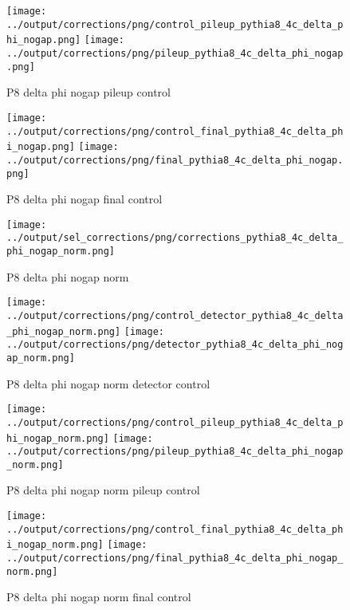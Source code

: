 \documentclass[11pt]{book}
\begin{document}
\begin{figure}[ht]
\centering
\texttt{[image: ../output/corrections/png/control\_pileup\_pythia8\_4c\_delta\_phi\_nogap.png]}
\texttt{[image: ../output/corrections/png/pileup\_pythia8\_4c\_delta\_phi\_nogap.png]}
\caption{P8 delta phi nogap pileup control}
\label{fig:p8_delta_phi_nogap_pileup_control}
\end{figure}


\begin{figure}[ht]
\centering
\texttt{[image: ../output/corrections/png/control\_final\_pythia8\_4c\_delta\_phi\_nogap.png]}
\texttt{[image: ../output/corrections/png/final\_pythia8\_4c\_delta\_phi\_nogap.png]}
\caption{P8 delta phi nogap final control}
\label{fig:p8_delta_phi_nogap_final_control}
\end{figure}


\begin{figure}[ht]
\centering
\texttt{[image: ../output/sel\_corrections/png/corrections\_pythia8\_4c\_delta\_phi\_nogap\_norm.png]}
\caption{P8 delta phi nogap norm}
\label{fig:p8_delta_phi_nogap_norm}
\end{figure}

\begin{figure}[ht]
\centering
\texttt{[image: ../output/corrections/png/control\_detector\_pythia8\_4c\_delta\_phi\_nogap\_norm.png]}
\texttt{[image: ../output/corrections/png/detector\_pythia8\_4c\_delta\_phi\_nogap\_norm.png]}
\caption{P8 delta phi nogap norm detector control}
\label{fig:p8_delta_phi_nogap_norm_detector_control}
\end{figure}

\begin{figure}[ht]
\centering
\texttt{[image: ../output/corrections/png/control\_pileup\_pythia8\_4c\_delta\_phi\_nogap\_norm.png]}
\texttt{[image: ../output/corrections/png/pileup\_pythia8\_4c\_delta\_phi\_nogap\_norm.png]}
\caption{P8 delta phi nogap norm pileup control}
\label{fig:p8_delta_phi_nogap_norm_pileup_control}
\end{figure}


\begin{figure}[ht]
\centering
\texttt{[image: ../output/corrections/png/control\_final\_pythia8\_4c\_delta\_phi\_nogap\_norm.png]}
\texttt{[image: ../output/corrections/png/final\_pythia8\_4c\_delta\_phi\_nogap\_norm.png]}
\caption{P8 delta phi nogap norm final control}
\label{fig:p8_delta_phi_nogap_norm_final_control}
\end{figure}
\end{document}
